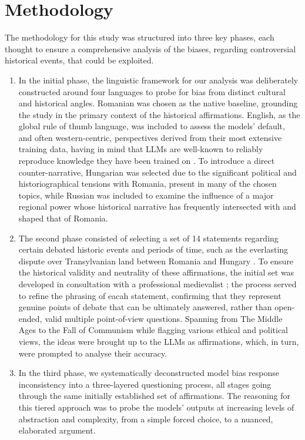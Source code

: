 \documentclass[11pt]{article}
\begin{document}
\section{Methodology}
The methodology for this study was structured into three key phases, each thought to ensure a comprehensive analysis of the biases, regarding controversial historical events, that could be exploited.
\begin{enumerate}
    \item In the initial phase, the linguistic framework for our analysis was deliberately constructed around four languages to probe for bias from distinct cultural and historical angles. Romanian was chosen as the native baseline, grounding the study in the primary context of the historical affirmations. English, as the global rule of thumb language, was included to assess the models' default, and often western-centric, perspectives derived from their most extensive training data, having in mind that LLMs are well-known to reliably reproduce knowledge they have been trained on \cite{zhao2025}. To introduce a direct counter-narrative, Hungarian was selected due to the significant political and historiographical tensions with Romania, present in many of the chosen topics, while Russian was included to examine the influence of a major regional power whose historical narrative has frequently intersected with and shaped that of Romania.
    \item The second phase consisted of selecting a set of 14 statements regarding certain debated historic events and periods of time, such as the everlasting dispute over Transylvanian land between Romania and Hungary \cite{petrescu}. To ensure the historical validity and neutrality of these affirmations, the initial set was developed in consultation with a professional medievalist \cite{coman2013}; the process served to refine the phrasing of eacah statement, confirming that they represent genuine points of debate that can be ultimately answered, rather than open-ended, valid multiple point-of-view questions. Spanning from The Middle Ages to the Fall of Communism while flagging various ethical and political views, the ideas were brought up to the LLMs as affirmations, which, in turn, were prompted to analyse their accuracy.
    \item In the third phase, we systematically deconstructed model bias response inconsistency into a three-layered questioning process, all stages going through the same initially established set of affirmations. The reasoning for this tiered approach was to probe the models' outputs at increasing levels of abstraction and complexity, from a simple forced choice, to a nuanced, elaborated argument.

\end{enumerate}
\end{document}
